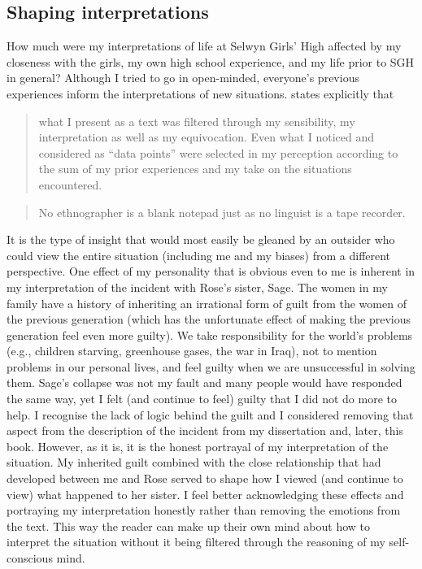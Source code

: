 \subsection{Shaping interpretations}

How much were my interpretations of life at Selwyn Girls' High affected by my closeness with the girls, my own high school experience, and my life prior to SGH in general?  Although I tried to go in open-minded, everyone's previous experiences inform the interpretations of new situations. \citet{mendozadenton2008} states explicitly that

\begin{quote}
	what I present as a text was filtered through my sensibility, my interpretation as well as my equivocation. Even what I noticed and considered as ``data points'' were selected in my perception according to the sum of my prior experiences and my take on the situations encountered. \citep[44]{mendozadenton2008}
\end{quote}

\begin{quote}
	No ethnographer is a blank note\-pad just as no linguist is a tape re\-corder. \citep[48]{mendozadenton2008}
\end{quote}
 
\noindent It is the type of insight that would most easily be gleaned by an outsider who could view the entire situation (including me and my biases) from a different perspective. One effect of my personality that is obvious even to me is inherent in my interpretation of the incident with Rose's sister, Sage. The women in my family have a history of inheriting an irrational form of guilt from the women of the previous generation (which has the unfortunate effect of making the previous generation feel even more guilty). We take responsibility for the world's problems (e.g., children starving, greenhouse gases, the war in Iraq), not to mention problems in our personal lives, and feel guilty when we are unsuccessful in solving them. Sage's collapse was not my fault and many people would have responded the same way, yet I felt (and continue to feel) guilty that I did not do more to help. I recognise the lack of logic behind the guilt and I considered removing that aspect from the description of the incident from my dissertation and, later, this book. However, as it is, it is the honest portrayal of my interpretation of the situation. My inherited guilt combined with the close relationship that had developed between me and Rose served to shape how I viewed (and continue to view) what happened to her sister. I feel better acknowledging these effects and portraying my interpretation honestly rather than removing the emotions from the text. This way the reader can make up their own mind about how to interpret the situation without it being filtered through the reasoning of my self-conscious mind.

